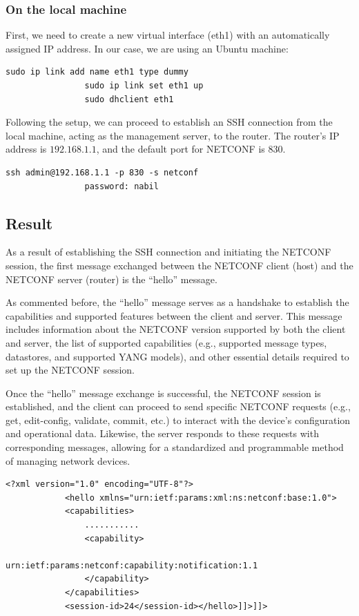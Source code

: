 \subsubsection{On the local machine}

\indent First, we need to create a new virtual interface (eth1) with an automatically assigned IP address. In our case, we are using an Ubuntu machine:
\begin{lstlisting}[style=xmlStyle,  backgroundcolor=\color{codebackground}]
                sudo ip link add name eth1 type dummy
                sudo ip link set eth1 up
                sudo dhclient eth1
\end{lstlisting}

Following the setup, we can proceed to establish an SSH connection from the local machine, acting as the management server, to the router. The router's IP address is $192.168.1.1$, and the default port for NETCONF is $830$.
\begin{lstlisting}[style=ubuntutermStyle,  backgroundcolor=\color{codebackground}]
                ssh admin@192.168.1.1 -p 830 -s netconf 
                password: nabil
\end{lstlisting}

\subsection{Result}

As a result of establishing the SSH connection and initiating the NETCONF session, the first message exchanged between the NETCONF client (host) and the NETCONF server (router) is the ``hello'' message. 

As commented before, the ``hello'' message serves as a handshake to establish the capabilities and supported features between the client and server. This message includes information about the NETCONF version supported by both the client and server, the list of supported capabilities (e.g., supported message types, datastores, and supported YANG models), and other essential details required to set up the NETCONF session.

Once the ``hello'' message exchange is successful, the NETCONF session is established, and the client can proceed to send specific NETCONF requests (e.g., get, edit-config, validate, commit, etc.) to interact with the device's configuration and operational data. Likewise, the server responds to these requests with corresponding messages, allowing for a standardized and programmable method of managing network devices.


\begin{lstlisting}[style=xmlStyle, caption={Excerpt from "hello" message.},  backgroundcolor=\color{codebackground}]
            <?xml version="1.0" encoding="UTF-8"?>
            <hello xmlns="urn:ietf:params:xml:ns:netconf:base:1.0">
            <capabilities>
                ...........
                <capability>
                    urn:ietf:params:netconf:capability:notification:1.1
                </capability>
            </capabilities>
            <session-id>24</session-id></hello>]]>]]>
\end{lstlisting}


